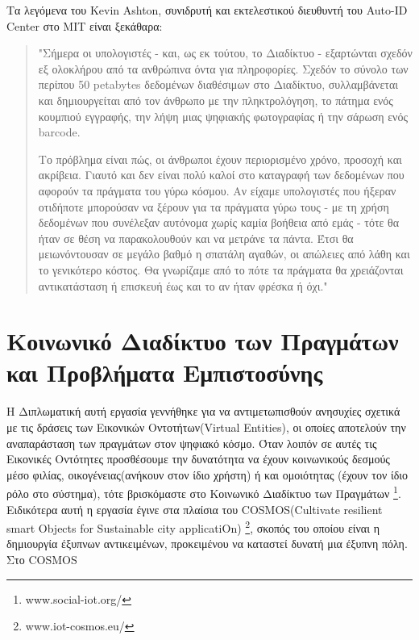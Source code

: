 Τα λεγόμενα του Kevin Ashton, συνιδρυτή και εκτελεστικού διευθυντή του Auto-ID Center στο ΜΙΤ είναι ξεκάθαρα:%
\begin{quotation}

"Σήμερα οι υπολογιστές - και, ως εκ τούτου, το Διαδίκτυο - εξαρτώνται σχεδόν εξ ολοκλήρου από τα ανθρώπινα όντα για πληροφορίες. Σχεδόν το σύνολο των περίπου 50 petabytes δεδομένων διαθέσιμων στο Διαδίκτυο, συλλαμβάνεται και δημιουργείται από τον άνθρωπο με την πληκτρολόγηση, το πάτημα ενός κουμπιού εγγραφής, την λήψη μιας ψηφιακής φωτογραφίας ή την σάρωση ενός barcode.


Το πρόβλημα είναι πώς, οι άνθρωποι έχουν περιορισμένο χρόνο, προσοχή και ακρίβεια. Γιαυτό και δεν είναι πολύ καλοί στο καταγραφή των δεδομένων που αφορούν τα πράγματα του γύρω κόσμου. Αν είχαμε υπολογιστές που ήξεραν οτιδήποτε μπορούσαν να ξέρουν για τα πράγματα γύρω τους - με τη χρήση δεδομένων που συνέλεξαν αυτόνομα χωρίς καμία βοήθεια από εμάς - τότε θα ήταν σε θέση να παρακολουθούν και να μετράνε τα πάντα. Έτσι θα μειωνόντουσαν σε μεγάλο βαθμό η σπατάλη αγαθών, οι απώλειες από λάθη και το γενικότερο κόστος. Θα γνωρίζαμε από το πότε τα πράγματα θα χρειάζονται αντικατάσταση ή επισκευή  έως και το αν ήταν φρέσκα ή όχι." 
\end{quotation}


\section{Κοινωνικό Διαδίκτυο των Πραγμάτων και Προβλήματα Εμπιστοσύνης}

Η Διπλωματική αυτή εργασία γεννήθηκε για να αντιμετωπισθούν ανησυχίες σχετικά με τις δράσεις των Εικονικών Οντοτήτων(Virtual Entities), οι οποίες αποτελούν την αναπαράσταση των πραγμάτων στον ψηφιακό κόσμο. Όταν λοιπόν σε αυτές τις Εικονικές Οντότητες προσθέσουμε την δυνατότητα να έχουν κοινωνικούς δεσμούς μέσο φιλίας, οικογένειας(ανήκουν στον ίδιο χρήστη) ή και ομοιότητας (έχουν τον ίδιο ρόλο στο σύστημα), τότε βρισκόμαστε στο Κοινωνικό Διαδίκτυο των Πραγμάτων \footnote{www.social-iot.org/}. Ειδικότερα αυτή η εργασία έγινε στα πλαίσια του COSMOS(Cultivate resilient smart Objects for Sustainable city applicatiOn) \footnote{www.iot-cosmos.eu/}, σκοπός του οποίου είναι η δημιουργία έξυπνων αντικειμένων, προκειμένου να καταστεί δυνατή μια έξυπνη πόλη. Στο COSMOS

